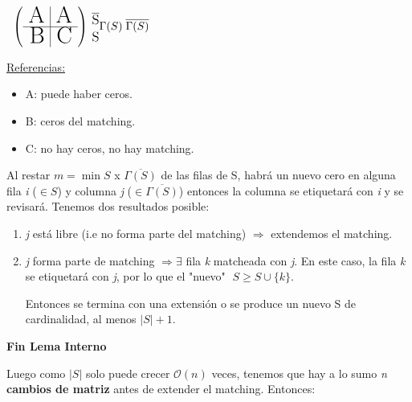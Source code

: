 \documentclass[12pt,a4paper]{report}
\begin{document}
\begin{enumerate}
				\begin{center}$
				\; \; \left(
				\begin{array}{r | r}
					\text{{\huge A}} & \text{{\huge A}} \\
					\hline
					\text{{\huge B}} & \text{{\huge C}}
				\end{array}
				\right)
				{\begin{subarray}{l} \; \overline{\text{{\large S}}} \\ \\ \; {\text{{\large S}}} \end{subarray}} \linebreak
				\Gamma(S) \; \overline{\Gamma(S)}
				$
				\end{center}
				
				\underline{Referencias:}
				\begin{itemize}
					\item A: puede haber ceros.
					\item B: ceros del matching.
					\item C: no hay ceros, no hay matching.
				\end{itemize}
				
				Al restar $\textit{m} = \min S$ x $\overline{\Gamma(S)}$ de las filas de S, habrá un nuevo cero en alguna fila \textit{i} ($\in S$) y columna \textit{j} ($\in \overline{\Gamma(S)}$) entonces la columna se etiquetará con \textit{i} y se revisará.
				Tenemos dos resultados posible:
				\begin{enumerate}
					\item \textit{j} está libre (i.e no forma parte del matching) $\Rightarrow$ extendemos el matching.
					\item \textit{j} forma parte de matching $\Rightarrow \exists$ fila \textit{k} matcheada con \textit{j}. En este caso, la fila \textit{k} se etiquetará con \textit{j}, por lo que el "nuevo" $\; S \geq S \cup \{\textit{k}\}$.
					
					\vspace{5mm}
					Entonces se termina con una extensión o se produce un nuevo S de cardinalidad, al menos $\lvert S \rvert + 1$.
				\end{enumerate}
				
				\textbf{Fin Lema Interno}
				
				Luego como $\lvert S \rvert$ solo puede crecer $\mathcal{O}(n)$ veces, tenemos que hay a lo sumo \textit{n} \textbf{cambios de matriz} antes de extender el matching. Entonces:
				

\end{enumerate}
\end{document}
